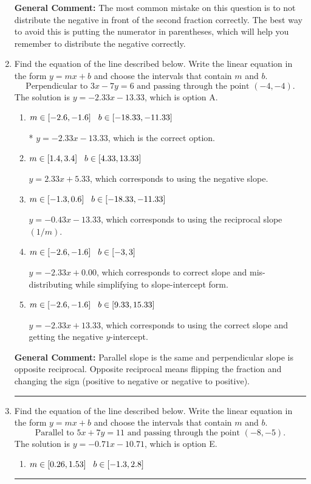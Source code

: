 \documentclass{extbook}[14pt]
\newcommand{\litem}[1]{\item #1

\rule{\textwidth}{0.4pt}}
\begin{document}
\begin{enumerate}
{\textbf{General Comment:} The most common mistake on this question is to not distribute the negative in front of the second fraction correctly. The best way to avoid this is putting the numerator in parentheses, which will help you remember to distribute the negative correctly.
}
\litem{
Find the equation of the line described below. Write the linear equation in the form $ y=mx+b $ and choose the intervals that contain $m$ and $b$.
\[ \text{Perpendicular to } 3 x - 7 y = 6 \text{ and passing through the point } (-4, -4). \]The solution is \( y = -2.33x - 13.33 \), which is option A.\begin{enumerate}[label=\Alph*.]
\item \( m \in [-2.6, -1.6] \hspace*{3mm} b \in [-18.33, -11.33] \)

* $y = -2.33x - 13.33$, which is the correct option.
\item \( m \in [1.4, 3.4] \hspace*{3mm} b \in [4.33, 13.33] \)

 $y = 2.33x + 5.33$, which corresponds to using the negative slope.
\item \( m \in [-1.3, 0.6] \hspace*{3mm} b \in [-18.33, -11.33] \)

 $y = -0.43x - 13.33$, which corresponds to using the reciprocal slope $(1/m)$.
\item \( m \in [-2.6, -1.6] \hspace*{3mm} b \in [-3, 3] \)

 $y = -2.33x + 0.00$, which corresponds to correct slope and mis-distributing while simplifying to slope-intercept form.
\item \( m \in [-2.6, -1.6] \hspace*{3mm} b \in [9.33, 15.33] \)

 $y = -2.33x + 13.33$, which corresponds to using the correct slope and getting the negative $y$-intercept.
\end{enumerate}

\textbf{General Comment:} Parallel slope is the same and perpendicular slope is opposite reciprocal. Opposite reciprocal means flipping the fraction and changing the sign (positive to negative or negative to positive).
}
\litem{
Find the equation of the line described below. Write the linear equation in the form $ y=mx+b $ and choose the intervals that contain $m$ and $b$.
\[ \text{Parallel to } 5 x + 7 y = 11 \text{ and passing through the point } (-8, -5). \]The solution is \( y = -0.71x - 10.71 \), which is option E.\begin{enumerate}[label=\Alph*.]
\item \( m \in [0.26, 1.53] \hspace*{3mm} b \in [-1.3, 2.8] \)


\end{enumerate}}
\end{enumerate}
\end{document}
